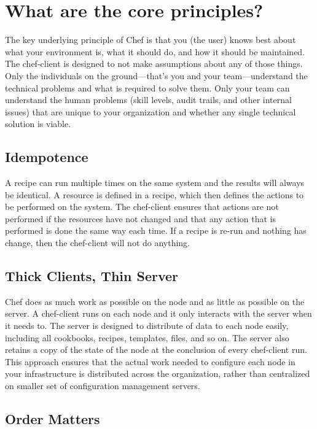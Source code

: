 \section{What are the core principles?}
\label{sec:what-principles}

The key underlying principle of Chef is that you (the user) knows best about what your environment is, what it should do, and how it should be maintained. The chef-client is designed to not make assumptions about any of those things. Only the individuals on the ground—that's you and your team—understand the technical problems and what is required to solve them. Only your team can understand the human problems (skill levels, audit trails, and other internal issues) that are unique to your organization and whether any single technical solution is viable.

\subsection{Idempotence}

A recipe can run multiple times on the same system and the results will always be identical. A resource is defined in a recipe, which then defines the actions to be performed on the system. The chef-client ensures that actions are not performed if the resources have not changed and that any action that is performed is done the same way each time. If a recipe is re-run and nothing has change, then the chef-client will not do anything.

\subsection{Thick Clients, Thin Server}

Chef does as much work as possible on the node and as little as possible on the server. A chef-client runs on each node and it only interacts with the server when it needs to. The server is designed to distribute of data to each node easily, including all cookbooks, recipes, templates, files, and so on. The server also retains a copy of the state of the node at the conclusion of every chef-client run. This approach ensures that the actual work needed to configure each node in your infrastructure is distributed across the organization, rather than centralized on smaller set of configuration management servers.

\subsection{Order Matters}

